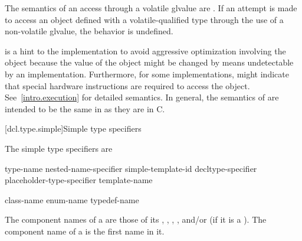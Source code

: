 \pnum
The semantics of an access through a volatile glvalue are
.
If an attempt is made to access an object defined with a
volatile-qualified type through the use of a non-volatile glvalue,
the behavior is undefined.

\pnum
{}%
%
\begin{note}
 is a hint to the implementation to avoid aggressive
optimization involving the object because the value of the object might
be changed by means undetectable by an implementation.
Furthermore, for some implementations,  might indicate that
special hardware instructions are required to access the object.
See~\ref{intro.execution} for detailed semantics. In general, the
semantics of  are intended to be the same in \Cpp{} as
they are in C.
\end{note}

[dcl.type.simple]{Simple type specifiers}%

\pnum
The simple type specifiers are
\begin{bnf}
\br
     type-name\br
    nested-name-specifier  simple-template-id\br
    decltype-specifier\br
    placeholder-type-specifier\br
     template-name\br
    \br
    \br
    \br
    \br
    \br
    \br
    \br
    \br
    \br
    \br
    \br
    \br
    \br
\end{bnf}

\begin{bnf}
\br
    class-name\br
    enum-name\br
    typedef-name
\end{bnf}

\pnum
{}
The component names of a  are those of its
,
,
,
, and/or
(if it is a ).
The component name of a  is the first name in it.

